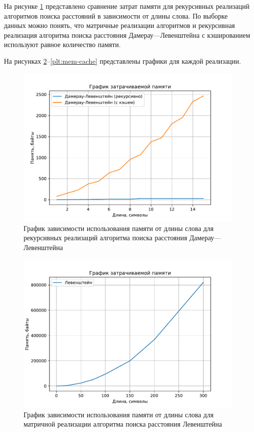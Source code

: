 На рисунке \ref{plt:mem-rec-cache} представлено сравнение затрат памяти для рекурсивных реализаций алгоритмов поиска расстояний в зависимости от длины слова. 
По выборке данных можно понять, что матричные реализации алгоритмов и рекурсивная реализация алгоритма поиска расстояния Дамерау---Левенштейна с кэшированием используют равное количество памяти.

На рисунках \ref{plt:mem-lev}--\ref{plt:mem-cache} представлены графики для каждой реализации.

\begin{figure}[H]
	\centering
	\includegraphics{assets/plots/mem-rec-cache.pdf}
	\caption{График зависимости использования памяти от длины слова для рекурсивных реализаций алгоритма поиска расстояния Дамерау---Левенштейна}
	\label{plt:mem-rec-cache}
\end{figure}

\begin{figure}[H]
	\centering
	\includegraphics{assets/plots/mem-lev.pdf}
	\caption{График зависимости использования памяти от длины слова для матричной реализации алгоритма поиска расстояния Левенштейна}
	\label{plt:mem-lev}
\end{figure}

